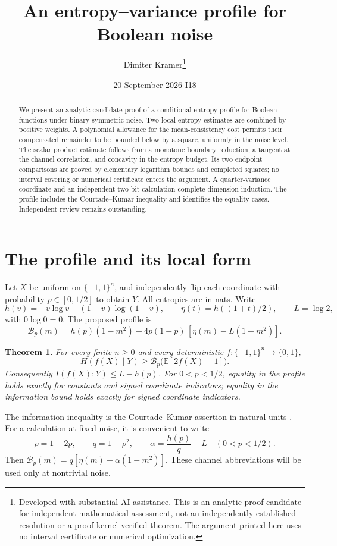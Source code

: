 \documentclass[11pt]{article}
\title{An entropy--variance profile for Boolean noise}
\author{Dimiter Kramer\thanks{Developed with substantial AI assistance. This is an analytic proof candidate for independent mathematical assessment, not an independently established resolution or a proof-kernel-verified theorem. The argument printed here uses no interval certificate or numerical optimization.}}
\date{20 September 2026 \qquad I18}
\newtheorem{theorem}{Theorem}[section]
\newcommand{\E}{\mathbb E}\newcommand{\Prb}{\mathbb P}
\newcommand{\B}{\mathcal B_p}\newcommand{\dd}{\,\mathrm d}
\numberwithin{equation}{section}
\begin{document}
\maketitle
\begin{abstract}
We present an analytic candidate proof of a conditional-entropy profile for Boolean functions under binary symmetric noise. Two local entropy estimates are combined by positive weights. A polynomial allowance for the mean-consistency cost permits their compensated remainder to be bounded below by a square, uniformly in the noise level. The scalar product estimate follows from a monotone boundary reduction, a tangent at the channel correlation, and concavity in the entropy budget. Its two endpoint comparisons are proved by elementary logarithm bounds and completed squares; no interval covering or numerical certificate enters the argument. A quarter-variance coordinate and an independent two-bit calculation complete dimension induction. The profile includes the Courtade--Kumar inequality and identifies the equality cases. Independent review remains outstanding.
\end{abstract}

\section{The profile and its local form}
Let $X$ be uniform on $\{-1,1\}^n$, and independently flip each coordinate with probability $p\in[0,1/2]$ to obtain $Y$. All entropies are in nats. Write
\[
 h(v)=-v\log v-(1-v)\log(1-v),\qquad
 \eta(t)=h((1+t)/2),\qquad L=\log2,
\]
with $0\log0=0$. The proposed profile is
\begin{equation}\label{profile}
 \B(m)=h(p)(1-m^2)+4p(1-p)\,[\eta(m)-L(1-m^2)].
\end{equation}
\begin{theorem}\label{main}
For every finite $n\ge0$ and every deterministic $f:\{-1,1\}^n\to\{0,1\}$,
\[
 H(f(X)\mid Y)\ge \B\bigl(\E[2f(X)-1]\bigr).
\]
Consequently $I(f(X);Y)\le L-h(p)$. For $0<p<1/2$, equality in the profile holds exactly for constants and signed coordinate indicators; equality in the information bound holds exactly for signed coordinate indicators.
\end{theorem}
The information inequality is the Courtade--Kumar assertion in natural units \cite{CK}.
For a calculation at fixed noise, it is convenient to write
\[
 \rho=1-2p,\qquad q=1-\rho^2,\qquad
 \alpha=\frac{h(p)}q-L\quad(0<p<1/2).
\]
Then $\B(m)=q[\eta(m)+\alpha(1-m^2)]$. These channel abbreviations will be used only at nontrivial noise.
\end{document}
